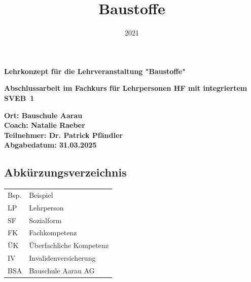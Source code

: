 \documentclass[
11pt,
captions=tableheading,
smallheadings,
headsepline,
footsepline, 
parskip=half-,
]{scrartcl}
\title{Baustoffe}
\date{2021}
\begin{document}
\pagestyle{scrheadings}







{\color{blau_bauschule}\fontsize{40pt}{21pt}\selectfont \textbf{Lehrkonzept für die Lehrveranstaltung "Baustoffe"}}

\vspace{3cm}

{\color{blau_bauschule}\fontsize{31pt}{30pt}\selectfont \textbf{Abschlussarbeit im Fachkurs für Lehrpersonen HF mit integriertem SVEB~1}}

\vspace{2cm}

{\color{blau_bauschule}\fontsize{25pt}{25pt}\selectfont \textbf{
Ort: Bauschule Aarau \\
\vspace{0.4cm}
Coach: Natalie Raeber\\
\vspace{0.4cm}
Teilnehmer: Dr. Patrick Pfändler\\
\vspace{0.4cm}
Abgabedatum: 31.03.2025
\vspace{0.4cm}
}}
\vspace{1cm}





\clearpage
\setcounter{tocdepth}{3} %
\tableofcontents%
\clearpage

\subsection*{Abkürzungsverzeichnis}
\begin{table}[H]
    \centering
    \label{tab:abkuerzungen}
    \begin{tabularx}{\textwidth}{@{}ll@{}}
        \toprule
        Bsp. & Beispiel                \\
        LP   & Lehrperson              \\
        SF   & Sozialform              \\
        FK   & Fachkompetenz           \\
        ÜK   & Überfachliche Kompetenz \\
        IV   & Invalidenversicherung \\
        BSA & Bauschule Aarau AG \\
        \bottomrule
    \end{tabularx}
\end{table}
\end{document}
